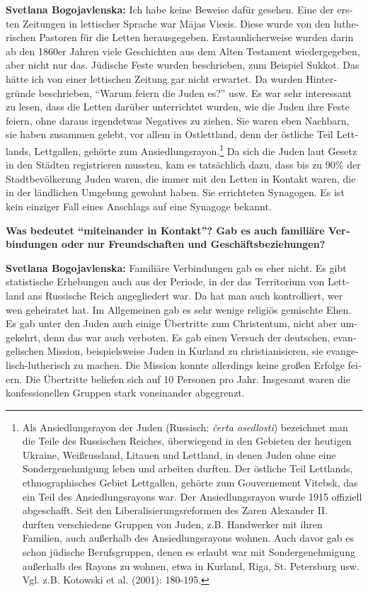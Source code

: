 \begin{otherlanguage}{ngerman}
\textbf{Svetlana Bogojavlenska:} Ich habe keine Beweise dafür gesehen. Eine der ersten Zeitungen in lettischer Sprache war Mājas Viesis. Diese wurde von den lutherischen Pastoren für die Letten herausgegeben. Erstaunlicherweise wurden darin ab den 1860er Jahren viele Geschichten aus dem Alten Testament wiedergegeben, aber nicht nur das. Jüdische Feste wurden beschrieben, zum Beispiel Sukkot. Das hätte ich von einer lettischen Zeitung gar nicht erwartet. Da wurden Hintergründe beschrieben, "`Warum feiern die Juden es?"' usw. Es war sehr interessant zu lesen, dass die Letten darüber unterrichtet wurden, wie die Juden ihre Feste feiern, ohne daraus irgendetwas Negatives zu ziehen. Sie waren eben Nachbarn, sie haben zusammen gelebt, vor allem in Ostlettland, denn der östliche Teil Lettlands, Lettgallen, gehörte zum Ansiedlungsrayon.\footnote{Als Ansiedlungsrayon der Juden (Russisch: \textit{čerta osedlosti}) bezeichnet man die Teile des Russischen Reiches, überwiegend in den Gebieten der heutigen Ukraine, Weißrussland, Litauen und Lettland, in denen Juden ohne eine Sondergenehmigung leben und arbeiten durften. Der östliche Teil Lettlands, ethnographisches Gebiet Lettgallen, gehörte zum Gouvernement Vitebsk, das ein Teil des Ansiedlungsrayons war. Der Ansiedlungsrayon wurde 1915 offiziell abgeschafft. Seit den Liberalisierungsreformen des Zaren Alexander II. durften verschiedene Gruppen von Juden, z.B. Handwerker mit ihren Familien, auch außerhalb des Ansiedlungsrayons wohnen. Auch davor gab es schon jüdische Berufsgruppen, denen es erlaubt war mit Sondergenehmigung außerhalb des Rayons zu wohnen, etwa in Kurland, Riga, St. Petersburg usw. Vgl. z.B. Kotowski et al. (2001): 180-195.} Da sich die Juden laut Gesetz in den Städten registrieren mussten, kam es tatsächlich dazu, dass bis zu 90\% der Stadtbevölkerung Juden waren, die immer mit den Letten in Kontakt waren, die in der ländlichen Umgebung gewohnt haben. Sie errichteten Synagogen. Es ist kein einziger Fall eines Anschlags auf eine Synagoge bekannt.

\textbf{Was bedeutet "`miteinander in Kontakt"'? Gab es auch familiäre Verbindungen oder nur Freundschaften und Geschäftsbeziehungen?}

\textbf{Svetlana Bogojavlenska:} Familiäre Verbindungen gab es eher nicht. Es gibt statistische Erhebungen auch aus der Periode, in der das Territorium von Lettland ans Russische Reich angegliedert war. Da hat man auch kontrolliert, wer wen geheiratet hat. Im Allgemeinen gab es sehr wenige religiös gemischte Ehen. Es gab unter den Juden auch einige Übertritte zum Christentum, nicht aber umgekehrt, denn das war auch verboten. Es gab einen Versuch der deutschen, evangelischen Mission, beispielsweise Juden in Kurland zu christianisieren, sie evangelisch-lutherisch zu machen. Die Mission konnte allerdings keine großen Erfolge feiern. Die Übertritte beliefen sich auf 10 Personen pro Jahr. Insgesamt waren die konfessionellen Gruppen stark voneinander abgegrenzt.


\end{otherlanguage}
